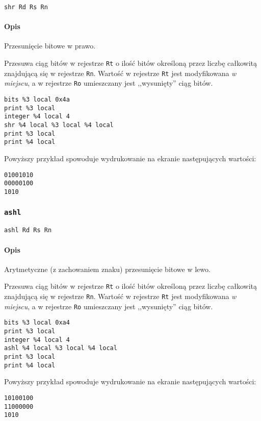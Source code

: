 \begin{lstlisting}
shr Rd Rs Rn
\end{lstlisting}

\paragraph*{Opis} Przesunięcie bitowe w prawo.

Przesuwa ciąg bitów w rejestrze \texttt{Rt} o ilość bitów określoną przez liczbę
całkowitą znajdującą się w rejestrze \texttt{Rn}. Wartość w rejestrze
\texttt{Rt} jest modyfikowana \emph{w miejscu}, a w rejestrze \texttt{Ro}
umieszczany jest ,,wysunięty'' ciąg bitów.
\begin{lstlisting}
bits %3 local 0x4a
print %3 local
integer %4 local 4
shr %4 local %3 local %4 local
print %3 local
print %4 local
\end{lstlisting}

Powyższy przykład spowoduje wydrukowanie na ekranie następujących wartości:
\begin{lstlisting}
01001010
00000100
1010
\end{lstlisting}

\subsubsection{\texttt{ashl}}

\begin{lstlisting}
ashl Rd Rs Rn
\end{lstlisting}

\paragraph*{Opis} Arytmetyczne (z zachowaniem znaku) przesunięcie bitowe w lewo.

Przesuwa ciąg bitów w rejestrze \texttt{Rt} o ilość bitów określoną przez liczbę
całkowitą znajdującą się w rejestrze \texttt{Rn}. Wartość w rejestrze
\texttt{Rt} jest modyfikowana \emph{w miejscu}, a w rejestrze \texttt{Ro}
umieszczany jest ,,wysunięty'' ciąg bitów.
\begin{lstlisting}
bits %3 local 0xa4
print %3 local
integer %4 local 4
ashl %4 local %3 local %4 local
print %3 local
print %4 local
\end{lstlisting}

Powyższy przykład spowoduje wydrukowanie na ekranie następujących wartości:
\begin{lstlisting}
10100100
11000000
1010
\end{lstlisting}

